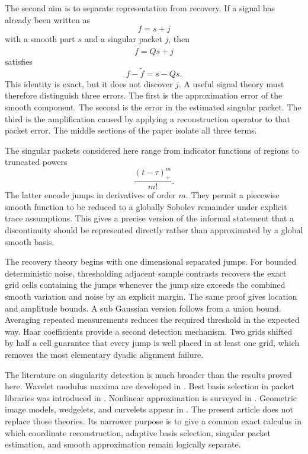\documentclass{aomart}
\theoremstyle{definition}
\theoremstyle{remark}
\begin{document}
The second aim is to separate representation from recovery. If a signal has already been written as
\[
f=s+j
\]
with a smooth part \(s\) and a singular packet \(j\), then
\[
\widetilde f=Qs+j
\]
satisfies
\[
f-\widetilde f=s-Qs.
\]
This identity is exact, but it does not discover \(j\). A useful signal theory must therefore distinguish three errors. The first is the approximation error of the smooth component. The second is the error in the estimated singular packet. The third is the amplification caused by applying a reconstruction operator to that packet error. The middle sections of the paper isolate all three terms.

The singular packets considered here range from indicator functions of regions to truncated powers
\[
\frac{(t-\tau)_+^m}{m!}.
\]
The latter encode jumps in derivatives of order \(m\). They permit a piecewise smooth function to be reduced to a globally Sobolev remainder under explicit trace assumptions. This gives a precise version of the informal statement that a discontinuity should be represented directly rather than approximated by a global smooth basis.

The recovery theory begins with one dimensional separated jumps. For bounded deterministic noise, thresholding adjacent sample contrasts recovers the exact grid cells containing the jumps whenever the jump size exceeds the combined smooth variation and noise by an explicit margin. The same proof gives location and amplitude bounds. A sub Gaussian version follows from a union bound. Averaging repeated measurements reduces the required threshold in the expected way. Haar coefficients provide a second detection mechanism. Two grids shifted by half a cell guarantee that every jump is well placed in at least one grid, which removes the most elementary dyadic alignment failure.

The literature on singularity detection is much broader than the results proved here. Wavelet modulus maxima are developed in \cite{MallatHwang1992}. Best basis selection in packet libraries was introduced in \cite{CoifmanWickerhauser1992}. Nonlinear approximation is surveyed in \cite{DeVore1998}. Geometric image models, wedgelets, and curvelets appear in \cite{Donoho1999,CandesDonoho2004}. The present article does not replace those theories. Its narrower purpose is to give a common exact calculus in which coordinate reconstruction, adaptive basis selection, singular packet estimation, and smooth approximation remain logically separate.
\end{document}
